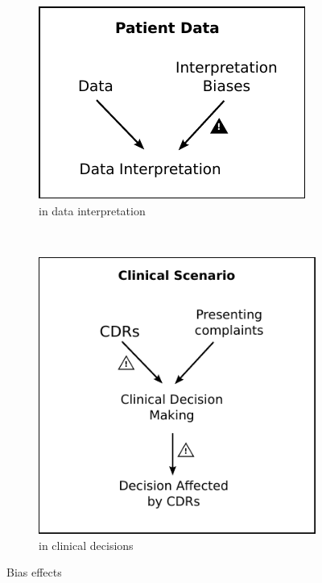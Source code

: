 \documentclass[a4paper]{scrartcl}     %
\begin{document}
    \begin{figure}[htb]
      \centering

      \begin{subfigure}[htb]{0.3\textwidth}
        \includegraphics[width=\textwidth]{images/data.pdf}
        \caption{in data interpretation}
        \label{fig:data}
      \end{subfigure}
      ~
      \begin{subfigure}[htb]{0.35\textwidth}
        \includegraphics[width=\textwidth]{images/clinic.pdf}
        \caption{in clinical decisions}
        \label{fig:clinic}
      \end{subfigure}

      \caption{Bias effects}\label{fig:effects}
    \end{figure}
\end{document}
